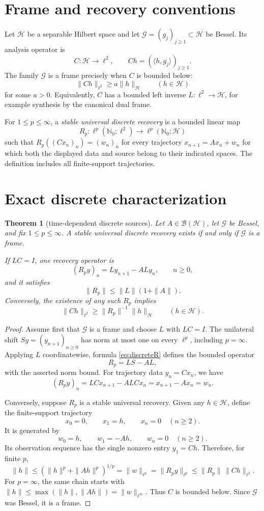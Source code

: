 \documentclass[11pt]{article}
\newtheorem{theorem}{Theorem}
\newcommand{\Hh}{\mathcal H}
\newcommand{\Gg}{\mathcal G}
\newcommand{\B}{\mathcal B}
\newcommand{\N}{\mathbb N}
\begin{document}
\section{Frame and recovery conventions}

Let \(\Hh\) be a separable Hilbert space and let
\(\Gg=(g_j)_{j\geq1}\subset\Hh\) be Bessel. Its analysis operator is
\[
 C:\Hh\longrightarrow\ell^2,\qquad
 Ch=(\langle h,g_j\rangle)_{j\geq1}.
\]
The family \(\Gg\) is a frame precisely when \(C\) is bounded below:
\[
 \|Ch\|_{\ell^2}\geq a\|h\|_{\Hh}\qquad(h\in\Hh)
\]
for some \(a>0\). Equivalently, \(C\) has a bounded left inverse
\(L:\ell^2\to\Hh\), for example synthesis by the canonical dual frame.

For \(1\leq p\leq\infty\), a \emph{stable universal discrete recovery} is a
bounded linear map
\[
 R_p:\ell^p(\N_0;\ell^2)\longrightarrow\ell^p(\N_0;\Hh)
\]
such that \(R_p((Cx_n)_n)=(w_n)_n\) for every trajectory
\(x_{n+1}=Ax_n+w_n\) for which both the displayed data and source belong to
their indicated spaces. The definition includes all finite-support
trajectories.

\section{Exact discrete characterization}

\begin{theorem}[time-dependent discrete sources]\label{thm:discrete}
Let \(A\in\B(\Hh)\), let \(\Gg\) be Bessel, and fix
\(1\leq p\leq\infty\). A stable universal discrete recovery exists if and
only if \(\Gg\) is a frame.

If \(LC=I\), one recovery operator is
\begin{equation}\label{eq:discreteR}
 (R_py)_n=Ly_{n+1}-ALy_n,\qquad n\geq0,
\end{equation}
and it satisfies
\[
 \|R_p\|\leq \|L\|(1+\|A\|).
\]
Conversely, the existence of any such \(R_p\) implies
\[
 \|Ch\|_{\ell^2}\geq \|R_p\|^{-1}\|h\|_{\Hh}
\qquad(h\in\Hh).
\]
\end{theorem}

\begin{proof}
Assume first that \(\Gg\) is a frame and choose \(L\) with \(LC=I\).
The unilateral shift \(Sy=(y_{n+1})_{n\geq0}\) has norm at most one on every
\(\ell^p\), including \(p=\infty\). Applying \(L\) coordinatewise, formula
\eqref{eq:discreteR} defines the bounded operator
\[
 R_p=L S-A L,
\]
with the asserted norm bound. For trajectory data \(y_n=Cx_n\), we have
\[
 (R_py)_n=LCx_{n+1}-ALCx_n=x_{n+1}-Ax_n=w_n.
\]

Conversely, suppose \(R_p\) is a stable universal recovery. Given any
\(h\in\Hh\), define the finite-support trajectory
\[
 x_0=0,\qquad x_1=h,\qquad x_n=0\quad(n\geq2).
\]
It is generated by
\[
 w_0=h,\qquad w_1=-Ah,\qquad w_n=0\quad(n\geq2).
\]
Its observation sequence has the single nonzero entry \(y_1=Ch\).
Therefore, for finite \(p\),
\[
 \|h\|\leq(\|h\|^p+\|Ah\|^p)^{1/p}
 =\|w\|_{\ell^p}
 =\|R_py\|_{\ell^p}
 \leq\|R_p\|\,\|Ch\|_{\ell^2}.
\]
For \(p=\infty\), the same chain starts with
\(\|h\|\leq\max(\|h\|,\|Ah\|)=\|w\|_{\ell^\infty}\).
Thus \(C\) is bounded below. Since \(\Gg\) was Bessel, it is a frame.
\end{proof}
\end{document}
